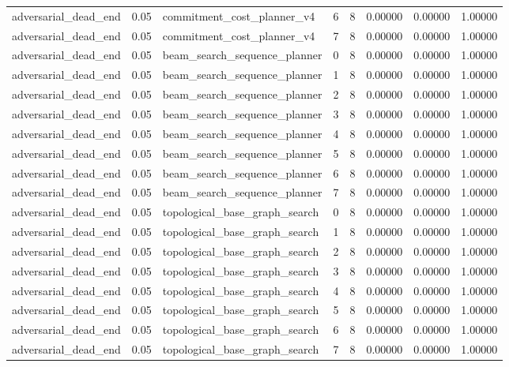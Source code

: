 \documentclass{article}
\begin{document}
\begin{table}[tbp]
{\begin{tabular}{llllllll}
adversarial\_dead\_end & 0.05 & commitment\_cost\_planner\_v4 & 6 & 8 & 0.00000 & 0.00000 & 1.00000 \\
adversarial\_dead\_end & 0.05 & commitment\_cost\_planner\_v4 & 7 & 8 & 0.00000 & 0.00000 & 1.00000 \\
adversarial\_dead\_end & 0.05 & beam\_search\_sequence\_planner & 0 & 8 & 0.00000 & 0.00000 & 1.00000 \\
adversarial\_dead\_end & 0.05 & beam\_search\_sequence\_planner & 1 & 8 & 0.00000 & 0.00000 & 1.00000 \\
adversarial\_dead\_end & 0.05 & beam\_search\_sequence\_planner & 2 & 8 & 0.00000 & 0.00000 & 1.00000 \\
adversarial\_dead\_end & 0.05 & beam\_search\_sequence\_planner & 3 & 8 & 0.00000 & 0.00000 & 1.00000 \\
adversarial\_dead\_end & 0.05 & beam\_search\_sequence\_planner & 4 & 8 & 0.00000 & 0.00000 & 1.00000 \\
adversarial\_dead\_end & 0.05 & beam\_search\_sequence\_planner & 5 & 8 & 0.00000 & 0.00000 & 1.00000 \\
adversarial\_dead\_end & 0.05 & beam\_search\_sequence\_planner & 6 & 8 & 0.00000 & 0.00000 & 1.00000 \\
adversarial\_dead\_end & 0.05 & beam\_search\_sequence\_planner & 7 & 8 & 0.00000 & 0.00000 & 1.00000 \\
adversarial\_dead\_end & 0.05 & topological\_base\_graph\_search & 0 & 8 & 0.00000 & 0.00000 & 1.00000 \\
adversarial\_dead\_end & 0.05 & topological\_base\_graph\_search & 1 & 8 & 0.00000 & 0.00000 & 1.00000 \\
adversarial\_dead\_end & 0.05 & topological\_base\_graph\_search & 2 & 8 & 0.00000 & 0.00000 & 1.00000 \\
adversarial\_dead\_end & 0.05 & topological\_base\_graph\_search & 3 & 8 & 0.00000 & 0.00000 & 1.00000 \\
adversarial\_dead\_end & 0.05 & topological\_base\_graph\_search & 4 & 8 & 0.00000 & 0.00000 & 1.00000 \\
adversarial\_dead\_end & 0.05 & topological\_base\_graph\_search & 5 & 8 & 0.00000 & 0.00000 & 1.00000 \\
adversarial\_dead\_end & 0.05 & topological\_base\_graph\_search & 6 & 8 & 0.00000 & 0.00000 & 1.00000 \\
adversarial\_dead\_end & 0.05 & topological\_base\_graph\_search & 7 & 8 & 0.00000 & 0.00000 & 1.00000 \\
\bottomrule
\end{tabular}
}
\end{table}
\end{document}
